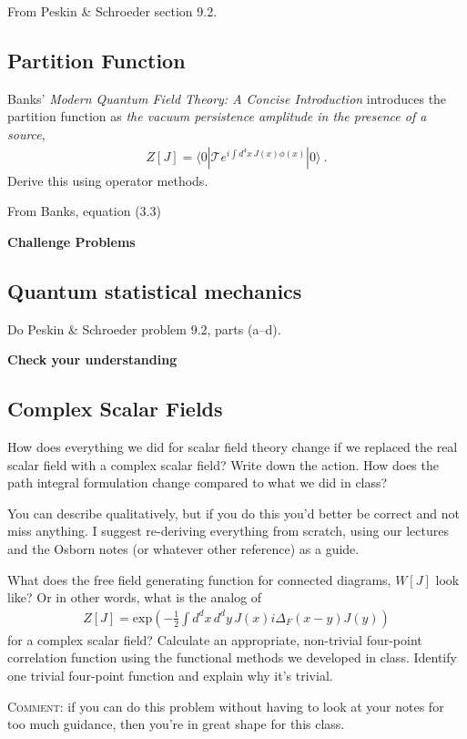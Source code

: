 \documentclass[12pt]{article}
\numberwithin{equation}{subsection}    %
\begin{document}
{\footnotesize From Peskin \& Schroeder section 9.2.}

\subsection{Partition Function}

Banks' \emph{Modern Quantum Field Theory: A Concise Introduction} introduces the partition function as \emph{the vacuum persistence amplitude in the presence of a source},
\begin{align}
	Z[J] = \langle 0 | \mathcal T e^{i\int d^4x\, J(x)\phi(x)}|0\rangle  \ .
\end{align}
Derive this using operator methods.


{\footnotesize From Banks, equation (3.3)}

\vspace{1em}
{\Large \bf \sffamily Challenge Problems}
\vspace{-1em}

\subsection{Quantum statistical mechanics}

Do Peskin \& Schroeder problem 9.2, parts (a--d).

\vspace{1em}
{\Large \bf \sffamily 
Check your understanding
}
\vspace{-1em}

\subsection{Complex Scalar Fields}

How does everything we did for scalar field theory change if we replaced the real scalar field with a complex scalar field? Write down the action. How does the path integral formulation change compared to what we did in class? 

You can describe qualitatively, but if you do this you'd better be correct and not miss anything. I suggest re-deriving everything from scratch, using our lectures and the Osborn notes (or whatever other reference) as a guide. 

What does the free field generating function for connected diagrams, $W[J]$ look like? Or in other words, what is the analog of
\begin{align}
	Z[J] = \text{exp}\left(
	-\frac{1}{2} \int d^dx\, d^dy \, J(x) i\Delta_F(x-y)J(y)
	\right)
\end{align}
for a complex scalar field? Calculate an appropriate, non-trivial four-point correlation function using the functional methods we developed in class. Identify one trivial four-point function and explain why it's trivial.


\textsc{Comment}: if you can do this problem without having to look at your notes for too much guidance, then you're in great shape for this class. 
\end{document}
